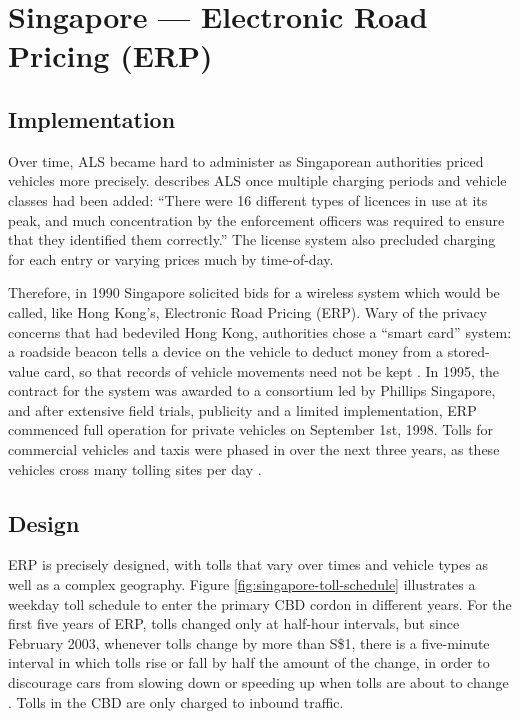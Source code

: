 \section{Singapore --- Electronic Road Pricing (ERP)}\label{sec:erp}

\subsection{Implementation}

Over time, ALS became hard to administer as Singaporean authorities priced vehicles more precisely. \citet[p. 4]{Chin2009} describes ALS once multiple charging periods and vehicle classes had been added: ``There were 16 different types of licences in use at its peak, and much concentration by the enforcement officers was required to ensure that they identified them correctly.'' The license system also precluded charging for each entry or varying prices much by time-of-day.

Therefore, in 1990 Singapore solicited bids for a wireless system which would be called, like Hong Kong's, Electronic Road Pricing (ERP). Wary of the privacy concerns that had bedeviled Hong Kong, authorities chose a ``smart card'' system: a roadside beacon tells a device on the vehicle to deduct money from a stored-value card, so that records of vehicle movements need not be kept \citep[p. 5]{Chin2009}. In 1995, the contract for the system was awarded to a consortium led by Phillips Singapore, and after extensive field trials, publicity and a limited implementation, ERP commenced full operation for private vehicles on September 1st, 1998. Tolls for commercial vehicles and taxis were phased in over the next three years, as these vehicles cross many tolling sites per day \citep[p. 64]{Menon2004}.

\subsection{Design}

ERP is precisely designed, with tolls that vary over times and vehicle types as well as a complex geography. Figure \ref{fig:singapore-toll-schedule} illustrates a weekday toll schedule to enter the primary CBD cordon in different years. For the first five years of ERP, tolls changed only at half-hour intervals, but since February 2003, whenever tolls change by more than S\$1, there is a five-minute interval in which tolls rise or fall by half the amount of the change, in order to discourage cars from slowing down or speeding up when tolls are about to change \citep{Menon2004}. Tolls in the CBD are only charged to inbound traffic. 

